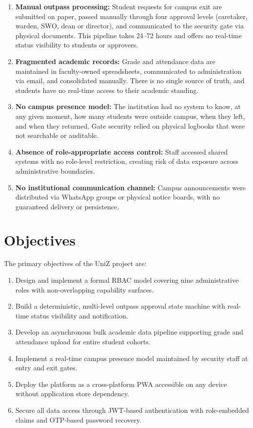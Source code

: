 \documentclass[12pt,a4paper]{report}
\begin{document}
\begin{enumerate}[label=(\arabic*)]
  \item \textbf{Manual outpass processing:} Student requests for campus exit are submitted on paper, passed manually through four approval levels (caretaker, warden, SWO, dean or director), and communicated to the security gate via physical documents. This pipeline takes 24--72 hours and offers no real-time status visibility to students or approvers.
  \item \textbf{Fragmented academic records:} Grade and attendance data are maintained in faculty-owned spreadsheets, communicated to administration via email, and consolidated manually. There is no single source of truth, and students have no real-time access to their academic standing.
  \item \textbf{No campus presence model:} The institution had no system to know, at any given moment, how many students were outside campus, when they left, and when they returned. Gate security relied on physical logbooks that were not searchable or auditable.
  \item \textbf{Absence of role-appropriate access control:} Staff accessed shared systems with no role-level restriction, creating risk of data exposure across administrative boundaries.
  \item \textbf{No institutional communication channel:} Campus announcements were distributed via WhatsApp groups or physical notice boards, with no guaranteed delivery or persistence.
\end{enumerate}

\section{Objectives}

The primary objectives of the UniZ project are:
\begin{enumerate}[label=(\arabic*)]
  \item Design and implement a formal RBAC model covering nine administrative roles with non-overlapping capability surfaces.
  \item Build a deterministic, multi-level outpass approval state machine with real-time status visibility and notification.
  \item Develop an asynchronous bulk academic data pipeline supporting grade and attendance upload for entire student cohorts.
  \item Implement a real-time campus presence model maintained by security staff at entry and exit gates.
  \item Deploy the platform as a cross-platform PWA accessible on any device without application store dependency.
  \item Secure all data access through JWT-based authentication with role-embedded claims and OTP-based password recovery.
\end{enumerate}
\end{document}

